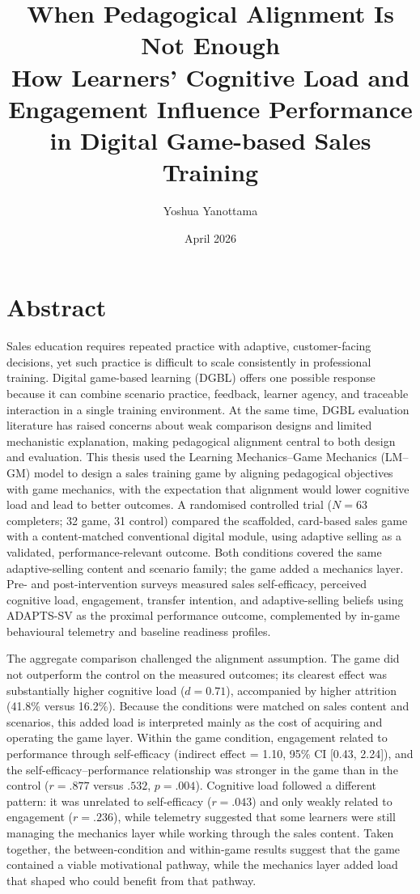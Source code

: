 \documentclass[12pt]{report}
\title{\textbf{When Pedagogical Alignment Is Not Enough}\\
How Learners' Cognitive Load and Engagement Influence Performance in Digital Game-based Sales Training}
\author{Yoshua Yanottama}
\date{April 2026}
\begin{document}
\hypersetup{pageanchor=false}
\maketitle
\hypersetup{pageanchor=true}

\chapter*{Abstract}
Sales education requires repeated practice with adaptive, customer-facing decisions, yet such practice is difficult to scale consistently in professional training. Digital game-based learning (DGBL) offers one possible response because it can combine scenario practice, feedback, learner agency, and traceable interaction in a single training environment. At the same time, DGBL evaluation literature has raised concerns about weak comparison designs and limited mechanistic explanation, making pedagogical alignment central to both design and evaluation. This thesis used the Learning Mechanics--Game Mechanics (LM--GM) model to design a sales training game by aligning pedagogical objectives with game mechanics, with the expectation that alignment would lower cognitive load and lead to better outcomes. A randomised controlled trial ($N = 63$ completers; 32 game, 31 control) compared the scaffolded, card-based sales game with a content-matched conventional digital module, using adaptive selling as a validated, performance-relevant outcome. Both conditions covered the same adaptive-selling content and scenario family; the game added a mechanics layer. Pre- and post-intervention surveys measured sales self-efficacy, perceived cognitive load, engagement, transfer intention, and adaptive-selling beliefs using ADAPTS-SV as the proximal performance outcome, complemented by in-game behavioural telemetry and baseline readiness profiles.

The aggregate comparison challenged the alignment assumption. The game did not outperform the control on the measured outcomes; its clearest effect was substantially higher cognitive load ($d = 0.71$), accompanied by higher attrition (41.8\% versus 16.2\%). Because the conditions were matched on sales content and scenarios, this added load is interpreted mainly as the cost of acquiring and operating the game layer. Within the game condition, engagement related to performance through self-efficacy (indirect effect = 1.10, 95\% CI [0.43, 2.24]), and the self-efficacy--performance relationship was stronger in the game than in the control ($r = .877$ versus $.532$, $p = .004$). Cognitive load followed a different pattern: it was unrelated to self-efficacy ($r = .043$) and only weakly related to engagement ($r = .236$), while telemetry suggested that some learners were still managing the mechanics layer while working through the sales content. Taken together, the between-condition and within-game results suggest that the game contained a viable motivational pathway, while the mechanics layer added load that shaped who could benefit from that pathway.
\end{document}
